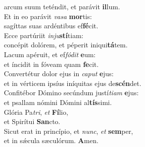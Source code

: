 \oddverse arcum suum teténdit, et parávit \textbf{il}lum.\\
\evenverse Et in eo parávit \textit{va}\textit{sa} \textbf{mor}tis:~\*\\
\evenverse sagíttas suas ardéntibus ef\textbf{fé}cit.\\
\oddverse Ecce partúriit \textit{in}\textit{ju}\textbf{stí}tiam:~\*\\
\oddverse concépit dolórem, et péperit iniqui\textbf{tá}tem.\\
\evenverse Lacum apéruit, et ef\textit{fó}\textit{dit} \textbf{e}um:~\*\\
\evenverse et íncidit in fóveam quam \textbf{fe}cit.\\
\oddverse Convertétur dolor ejus in \textit{ca}\textit{put} \textbf{e}jus:~\*\\
\oddverse et in vérticem ipsíus iníquitas ejus de\textbf{scén}det.\\
\evenverse Confitébor Dómino secúndum justí\textit{ti}\textit{am} \textbf{e}jus:~\*\\
\evenverse et psallam nómini Dómini al\textbf{tís}simi.\\
\oddverse Glória Pa\textit{tri}, \textit{et} \textbf{Fí}lio,~\*\\
\oddverse et Spirítui \textbf{San}cto.\\
\evenverse Sicut erat in princípio, et \textit{nunc}, \textit{et} \textbf{sem}per,~\*\\
\evenverse et in sǽcula sæculórum. \textbf{A}men.\\
